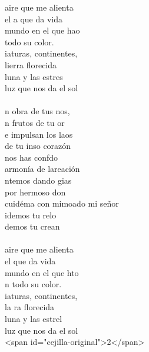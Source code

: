 \begin{cancion}%
	 aire que me alienta\\
	el a que da vida\\
	 mundo en el que hao\\
	 todo su color.\\
	iaturas, continentes,\\
	lierra florecida\\
	 luna y las estres\\
	luz que nos da el sol\\
\jump\\
	n obra de tus nos,\\
	n frutos de tu or\\
	e impulsan los laos\\
	de tu inso corazón\\
	 nos has confdo \\
	 armonía de lareación\\
	ntemos dando gias \\
	por  hermoso don\\
	cuidéma con mimoado mi señor\\
	idemos tu relo\\
	demos tu crean \\
\jump\\
	 aire que me alienta\\
	el  que da vida\\
	mundo en el que hto\\
	n todo su color.\\
	iaturas, continentes,\\
	la ra florecida\\
	luna y las estrel\\
	 luz que nos da el sol \\
<span id="cejilla-original">2</span>\\
\end{cancion}%
